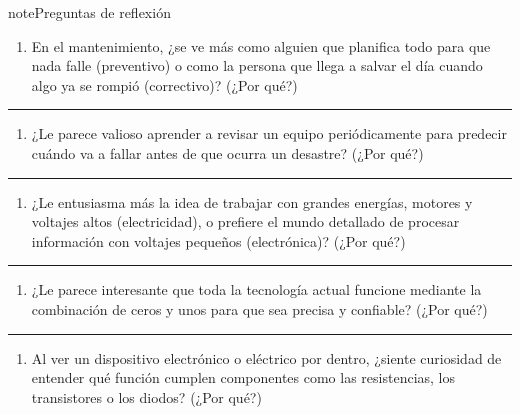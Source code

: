\documentclass[letterpaper,10pt,spanish]{sphinxmanual}
\begin{document}
\begin{sphinxadmonition}{note}{Preguntas de reflexión}
\begin{enumerate}
%
\item {} 
\sphinxAtStartPar
En el mantenimiento, ¿se ve más como alguien que planifica todo para que nada falle (preventivo) o como la persona que llega a salvar el día cuando algo ya se rompió (correctivo)? (¿Por qué?)

\end{enumerate}


\bigskip\hrule\bigskip

\begin{enumerate}
%
\setcounter{enumi}{1}
\item {} 
\sphinxAtStartPar
¿Le parece valioso aprender a revisar un equipo periódicamente para predecir cuándo va a fallar antes de que ocurra un desastre? (¿Por qué?)

\end{enumerate}


\bigskip\hrule\bigskip

\begin{enumerate}
%
\setcounter{enumi}{2}
\item {} 
\sphinxAtStartPar
¿Le entusiasma más la idea de trabajar con grandes energías, motores y voltajes altos (electricidad), o prefiere el mundo detallado de procesar información con voltajes pequeños (electrónica)? (¿Por qué?)

\end{enumerate}


\bigskip\hrule\bigskip

\begin{enumerate}
%
\setcounter{enumi}{3}
\item {} 
\sphinxAtStartPar
¿Le parece interesante que toda la tecnología actual funcione mediante la combinación de ceros y unos para que sea precisa y confiable? (¿Por qué?)

\end{enumerate}


\bigskip\hrule\bigskip

\begin{enumerate}
%
\setcounter{enumi}{4}
\item {} 
\sphinxAtStartPar
Al ver un dispositivo electrónico o eléctrico por dentro, ¿siente curiosidad de entender qué función cumplen componentes como las resistencias, los transistores o los diodos? (¿Por qué?)


\end{enumerate}
\end{sphinxadmonition}
\end{document}
